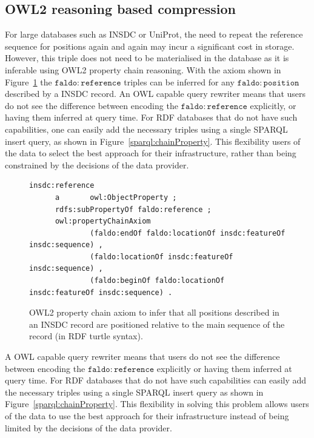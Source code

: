 \subsection*{OWL2 reasoning based compression}
For large databases such as INSDC or UniProt,
the need to repeat the reference sequence for positions again and again may incur a significant cost in storage.
However, this triple does not need to be materialised in the database as it is inferable using OWL2 property chain reasoning.
With the axiom shown in Figure~\ref{owl:chainProperty} the $\mathtt{faldo\colon{}reference}$ triples can be inferred for any $\mathtt{faldo\colon{}position}$ described by a INSDC record.
An OWL capable query rewriter means that users do not see the difference between encoding the $\mathtt{faldo\colon{}reference}$ explicitly, or having them inferred at query time.
For RDF databases that do not have such capabilities,
one can easily add the necessary triples using a single SPARQL insert query,
as shown in Figure~\ref{sparql:chainProperty}.
This flexibility users of the data to select the best approach for their infrastructure, rather than being constrained by the decisions of the data provider.

\begin{figure}
\begin{shaded}
\small
\begin{verbatim}
insdc:reference
      a       owl:ObjectProperty ;
      rdfs:subPropertyOf faldo:reference ;
      owl:propertyChainAxiom
              (faldo:endOf faldo:locationOf insdc:featureOf insdc:sequence) , 
              (faldo:locationOf insdc:featureOf insdc:sequence) , 
              (faldo:beginOf faldo:locationOf insdc:featureOf insdc:sequence) .

\end{verbatim}
\end{shaded}
\caption{OWL2 property chain axiom to infer that all positions described in an INSDC record are positioned relative to the main sequence of the record (in RDF turtle syntax).}
\label{owl:chainProperty}
\end{figure}

A OWL capable query rewriter means that users do not see the difference between encoding the $\mathtt{faldo\colon{}reference}$ explicitly or having them inferred at query time.
For RDF databases that do not have such capabilities can easily add the necessary triples using a single SPARQL insert query as shown in Figure~\ref{sparql:chainProperty}.
This flexibility in solving this problem allows users of the data to use the best approach for their infrastructure instead of being limited by the decisions of the data provider.

